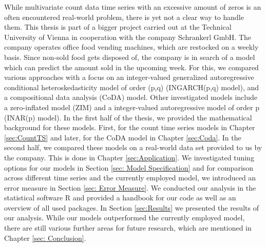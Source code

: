While multivariate count data time series with an excessive amount of zeros is an often encountered real-world problem, there is yet not a clear way to handle them. This thesis is part of a bigger project carried out at the Technical University of Vienna in cooperation with the company Schrankerl GmbH. The company operates office food vending machines, which are restocked on a weekly basis. Since non-sold food gets disposed of, the company is in search of a model which can predict the amount sold in the upcoming week. For this, we compared various approaches with a focus on an integer-valued generalized autoregressive conditional heteroskedasticity model of order (p,q) (INGARCH(p,q) model), and a compositional data analysis (CoDA) model. Other investigated models include a zero-inflated model (ZIM) and a integer-valued autoregressive model of order p (INAR(p) model). In the first half of the thesis, we provided the mathematical background for these models. First, for the count time series models in Chapter \ref{sec:CountTS} and later, for the CoDA model in Chapter \ref{sec:Coda}. In the second half, we compared these models on a real-world data set provided to us by the company. This is done in Chapter \ref{sec:Application}. We investigated tuning options for our models in Section \ref{sec: Model Specification} and for comparison across different time series and the currently employed model, we introduced an error measure in Section \ref{sec: Error Measure}. We conducted our analysis in the statistical software R and provided a handbook for our code as well as an overview of all used packages. In Section \ref{sec:Results} we presented the results of our analysis.  While our models outperformed the currently employed model, there are still various further areas for future research, which are mentioned in Chapter \ref{sec: Conclusion}. 